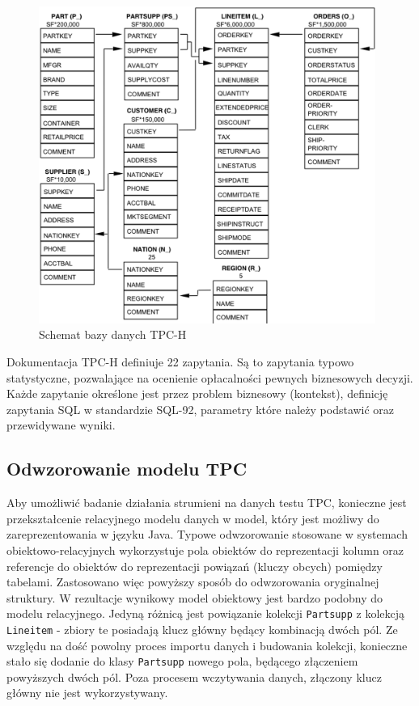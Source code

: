 \documentclass[12pt]{extarticle}
\begin{document}
\begin{figure}
\centering
\includegraphics[width=11cm]{tpc-schema.png}
\caption{Schemat bazy danych TPC-H}
\label{fig:tpcschema}
\end{figure}

    Dokumentacja TPC-H definiuje 22 zapytania. Są to zapytania typowo statystyczne, pozwalające na ocenienie opłacalności pewnych biznesowych decyzji. Każde zapytanie określone jest przez problem biznesowy (kontekst), definicję zapytania SQL w standardzie SQL-92, parametry które należy podstawić oraz przewidywane wyniki.

\subsection{Odwzorowanie modelu TPC}

    Aby umożliwić badanie działania strumieni na danych testu TPC, konieczne jest przekształcenie relacyjnego modelu danych w model, który jest możliwy do zareprezentowania w języku Java. Typowe odwzorowanie stosowane w systemach obiektowo-relacyjnych wykorzystuje pola obiektów do reprezentacji kolumn oraz referencje do obiektów do reprezentacji powiązań (kluczy obcych) pomiędzy tabelami. Zastosowano więc powyższy sposób do odwzorowania oryginalnej struktury. W rezultacje wynikowy model obiektowy jest bardzo podobny do modelu relacyjnego. Jedyną różnicą jest powiązanie kolekcji \texttt{Partsupp} z kolekcją \texttt{Lineitem} - zbiory te posiadają klucz główny będący kombinacją dwóch pól. Ze względu na dość powolny proces importu danych i budowania kolekcji, konieczne stało się dodanie do klasy \texttt{Partsupp} nowego pola, będącego złączeniem powyższych dwóch pól. Poza procesem wczytywania danych, złączony klucz główny nie jest wykorzystywany.
\end{document}

